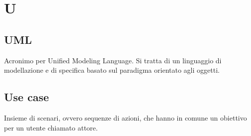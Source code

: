 \chapter{U}
\section{UML}\label{sec:Unified Modeling Language}
Acronimo per Unified Modeling Language. Si tratta di un linguaggio di modellazione e di specifica basato sul paradigma orientato agli oggetti.

\section{Use case}\label{sec:Use Cases}
Insieme di scenari, ovvero sequenze di azioni, che hanno in comune un obiettivo per un utente chiamato attore.
